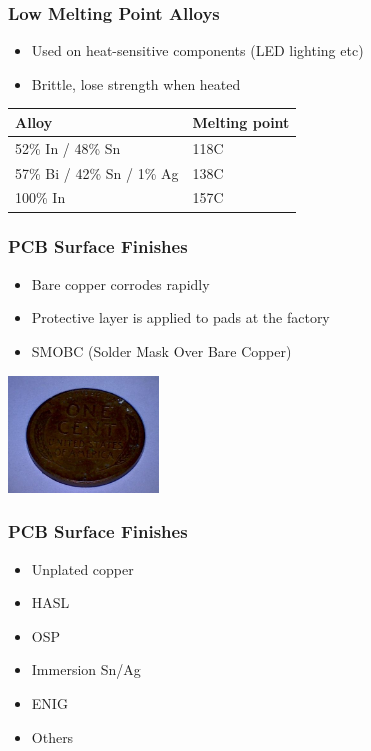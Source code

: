 \documentclass{beamer}
\begin{document}
\begin{frame}
\frametitle{Low Melting Point Alloys}
\begin{itemize}
\item Used on heat-sensitive components (LED lighting etc)
\item Brittle, lose strength when heated
\end{itemize}
\begin{tabularx}{\textwidth}{| X | X |}
\hline
\textbf{Alloy} & \textbf{Melting point}	\\ \hline
52\% In / 48\% Sn & 118C				\\ \hline
57\% Bi / 42\% Sn / 1\% Ag & 138C		\\ \hline
100\% In & 157C							\\ \hline
\end{tabularx}
\end{frame}

\begin{frame}
\frametitle{PCB Surface Finishes}
\begin{itemize}
\item Bare copper corrodes rapidly
\item Protective layer is applied to pads at the factory
\item SMOBC (Solder Mask Over Bare Copper)
\end{itemize}
\begin{center}
\includegraphics[width=4cm,keepaspectratio]{oxidized-copper.jpg}
\end{center}
\end{frame}

\begin{frame}
\frametitle{PCB Surface Finishes}
\begin{itemize}
\item Unplated copper
\item HASL
\item OSP
\item Immersion Sn/Ag
\item ENIG
\item Others
\end{itemize}
\end{frame}
\end{document}
